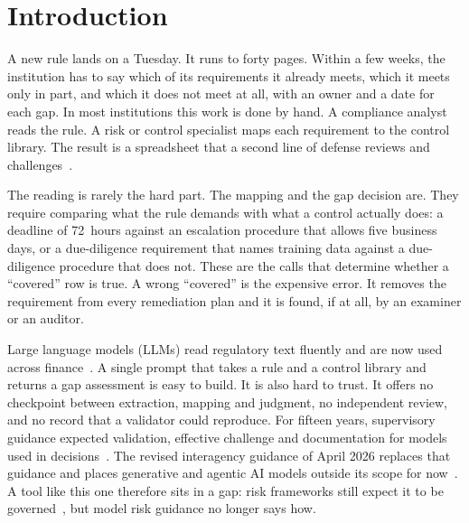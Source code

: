 \documentclass[sigconf,review,anonymous]{acmart}
\begin{document}


\maketitle

\section{Introduction}
\label{sec:intro}

A new rule lands on a Tuesday. It runs to forty pages. Within a few weeks,
the institution has to say which of its requirements it already meets, which
it meets only in part, and which it does not meet at all, with an owner and
a date for each gap. In most institutions this work is done by hand. A
compliance analyst reads the rule. A risk or control specialist maps each
requirement to the control library. The result is a spreadsheet that a
second line of defense reviews and challenges~\cite{iia3lines}.

The reading is rarely the hard part. The mapping and the gap decision are.
They require comparing what the rule demands with what a control actually
does: a deadline of 72~hours against an escalation procedure that allows
five business days, or a due-diligence requirement that names training data
against a due-diligence procedure that does not. These are the calls that
determine whether a ``covered'' row is true. A wrong ``covered'' is the
expensive error. It removes the requirement from every remediation plan and
it is found, if at all, by an examiner or an auditor.

Large language models (LLMs) read regulatory text fluently and are now used
across finance~\cite{li2023llmfinance,wu2023bloomberggpt}. A single prompt
that takes a rule and a control library and returns a gap assessment is easy
to build. It is also hard to trust. It offers no checkpoint between
extraction, mapping and judgment, no independent review, and no record that
a validator could reproduce. For fifteen years, supervisory guidance expected
validation, effective challenge and documentation for models used in
decisions~\cite{sr117}. The revised interagency guidance of April 2026 replaces
that guidance and places generative and agentic AI models outside its scope
for now~\cite{mrm2026}. A tool like this one therefore sits in a gap: risk
frameworks still expect it to be governed~\cite{nistairmf}, but model risk
guidance no longer says how.
\end{document}
